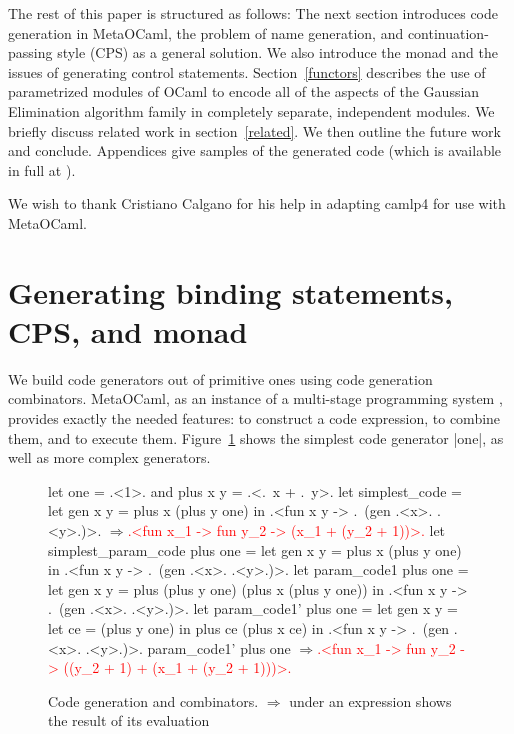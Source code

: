 \documentclass{llncs}
\newcommand{\evalresult}[1]{\ensuremath{\Longrightarrow}\textcolor{red}{#1}}
\begin{document}
The rest of this paper is structured as follows: The next section
introduces code generation in MetaOCaml, the problem of name
generation, and continuation-passing style (CPS) as a general
solution.  We also introduce the monad and the issues of generating
control statements. Section~\ref{functors} describes the use of
parametrized modules of OCaml to encode all of the aspects of the
Gaussian Elimination algorithm family in completely separate,
independent modules.  We briefly discuss related work in
section~\ref{related}. We then outline the future work and conclude.
Appendices give samples of the generated code (which is available in
full at \cite{metamonadsURL}).

We wish to thank Cristiano Calgano for his help in adapting camlp4 for
use with MetaOCaml.


\section{Generating binding statements, CPS, and monad}\label{CPS}

We build code generators out of primitive ones using code generation 
combinators. MetaOCaml, as an instance of a multi-stage
programming system \cite{TahaThesis}, provides exactly the needed
features: to construct a code expression, to combine them, and to
execute them. Figure~\ref{easycode} shows the simplest code generator |one|,
as well as more complex generators.

\begin{figure}\label{easycode}
\begin{code}
let one = .<1>. and plus x y = .<.~x + .~y>.
let simplest_code = let gen x y = plus x (plus y one) in
  .<fun x y -> .~(gen .<x>. .<y>.)>.
\evalresult{.<fun x_1 -> fun y_2 -> (x_1 + (y_2 + 1))>.}
let simplest_param_code plus one = let gen x y = plus x (plus y one) in
  .<fun x y -> .~(gen .<x>. .<y>.)>.
let param_code1 plus one =
  let gen x y = plus (plus y one) (plus x (plus y one)) in
  .<fun x y -> .~(gen .<x>. .<y>.)>.
let param_code1' plus one =
  let gen x y = let ce = (plus y one) in  plus ce (plus x ce) in
  .<fun x y -> .~(gen .<x>. .<y>.)>.
param_code1' plus one
\evalresult{.<fun x_1 -> fun y_2 -> ((y_2 + 1) + (x_1 + (y_2 + 1)))>.}
\end{code}
\caption{Code generation and combinators. $\Longrightarrow$ under an
  expression shows the result of its evaluation}
\end{figure}
\end{document}
